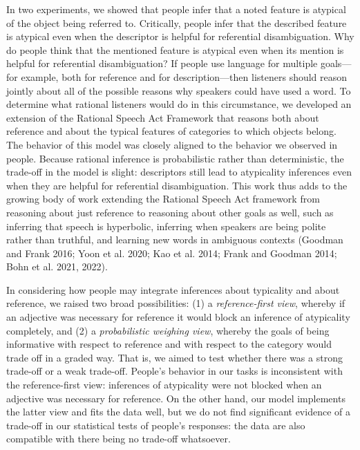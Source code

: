 \documentclass{ucetd}
\begin{document}
In two experiments, we showed that people infer that a noted feature is
atypical of the object being referred to. Critically, people infer that
the described feature is atypical even when the descriptor is helpful
for referential disambiguation. Why do people think that the mentioned
feature is atypical even when its mention is helpful for referential
disambiguation? If people use language for multiple goals---for example,
both for reference and for description---then listeners should reason
jointly about all of the possible reasons why speakers could have used a
word. To determine what rational listeners would do in this
circumstance, we developed an extension of the Rational Speech Act
Framework that reasons both about reference and about the typical
features of categories to which objects belong. The behavior of this
model was closely aligned to the behavior we observed in people. Because
rational inference is probabilistic rather than deterministic, the
trade-off in the model is slight: descriptors still lead to atypicality
inferences even when they are helpful for referential disambiguation.
This work thus adds to the growing body of work extending the Rational
Speech Act framework from reasoning about just reference to reasoning
about other goals as well, such as inferring that speech is hyperbolic,
inferring when speakers are being polite rather than truthful, and
learning new words in ambiguous contexts (Goodman and Frank 2016; Yoon
et al. 2020; Kao et al. 2014; Frank and Goodman 2014; Bohn et al. 2021,
2022).

In considering how people may integrate inferences about typicality and
about reference, we raised two broad possibilities: (1) a
\emph{reference-first view}, whereby if an adjective was necessary for
reference it would block an inference of atypicality completely, and (2)
a \emph{probabilistic weighing view}, whereby the goals of being
informative with respect to reference and with respect to the category
would trade off in a graded way. That is, we aimed to test whether there
was a strong trade-off or a weak trade-off. People's behavior in our
tasks is inconsistent with the reference-first view: inferences of
atypicality were not blocked when an adjective was necessary for
reference. On the other hand, our model implements the latter view and
fits the data well, but we do not find significant evidence of a
trade-off in our statistical tests of people's responses: the data are
also compatible with there being no trade-off whatsoever.
\end{document}
